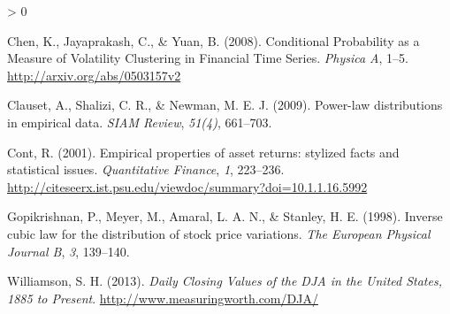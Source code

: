 \documentclass[
  11pt,
]{article}
\newlength{\cslhangindent}
\newenvironment{CSLReferences}[2] %
 {%
  \setlength{\parindent}{0pt}
  \ifodd #1 \everypar{\setlength{\hangindent}{\cslhangindent}}\ignorespaces\fi
  \ifnum #2 > 0
  \setlength{\parskip}{#2\baselineskip}
  \fi
 }%
 {}
\begin{document}
\hypertarget{refs}{}
\begin{CSLReferences}{1}{0}
\leavevmode\hypertarget{ref-Chen-2008}{}%
Chen, K., Jayaprakash, C., \& Yuan, B. (2008). {Conditional Probability
as a Measure of Volatility Clustering in Financial Time Series}.
\emph{Physica A}, 1--5. \url{http://arxiv.org/abs/0503157v2}

\leavevmode\hypertarget{ref-Clauset2009}{}%
Clauset, A., Shalizi, C. R., \& Newman, M. E. J. (2009). {Power-law
distributions in empirical data}. \emph{SIAM Review}, \emph{51(4)},
661--703.

\leavevmode\hypertarget{ref-Cont2001}{}%
Cont, R. (2001). {Empirical properties of asset returns: stylized facts
and statistical issues}. \emph{Quantitative Finance}, \emph{1},
223--236.
\url{http://citeseerx.ist.psu.edu/viewdoc/summary?doi=10.1.1.16.5992}

\leavevmode\hypertarget{ref-Gopikrishnana1998}{}%
Gopikrishnan, P., Meyer, M., Amaral, L. A. N., \& Stanley, H. E. (1998).
{Inverse cubic law for the distribution of stock price variations}.
\emph{The European Physical Journal B}, \emph{3}, 139--140.

\leavevmode\hypertarget{ref-Williamson2013}{}%
Williamson, S. H. (2013). \emph{{Daily Closing Values of the DJA in the
United States, 1885 to Present}}.
\url{http://www.measuringworth.com/DJA/}

\end{CSLReferences}
\end{document}
